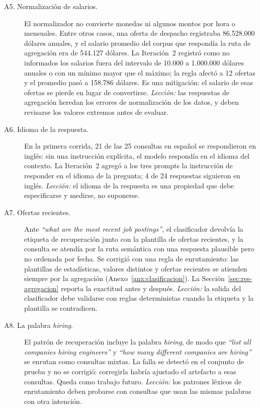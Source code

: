 \begin{description}
    \item[A5. Normalización de salarios.] El normalizador no convierte monedas ni algunos montos por hora o mensuales. Entre otros casos, una oferta de despacho registraba 86.528.000 dólares anuales, y el salario promedio del corpus que respondía la ruta de agregación era de 544.127 dólares. La Iteración~2 registró como no informados los salarios fuera del intervalo de 10.000 a 1.000.000 dólares anuales o con un mínimo mayor que el máximo; la regla afectó a 12 ofertas y el promedio pasó a 158.786 dólares. Es una mitigación: el salario de esas ofertas se pierde en lugar de convertirse. \emph{Lección:} las respuestas de agregación heredan los errores de normalización de los datos, y deben revisarse los valores extremos antes de evaluar.
    \item[A6. Idioma de la respuesta.] En la primera corrida, 21 de las 25 consultas en español se respondieron en inglés: sin una instrucción explícita, el modelo respondía en el idioma del contexto. La Iteración~2 agregó a los tres prompts la instrucción de responder en el idioma de la pregunta; 4 de 24 respuestas siguieron en inglés. \emph{Lección:} el idioma de la respuesta es una propiedad que debe especificarse y medirse, no suponerse.
    \item[A7. Ofertas recientes.] Ante \textit{\enquote{what are the most recent job postings}}, el clasificador devolvía la etiqueta de recuperación junto con la plantilla de ofertas recientes, y la consulta se atendía por la ruta semántica con una respuesta plausible pero no ordenada por fecha. Se corrigió con una regla de enrutamiento: las plantillas de estadísticas, valores distintos y ofertas recientes se atienden siempre por la agregación (Anexo~\ref{anx:clasificacion}). La Sección~\ref{sec:res-agregacion} reporta la exactitud antes y después. \emph{Lección:} la salida del clasificador debe validarse con reglas deterministas cuando la etiqueta y la plantilla se contradicen.
    \item[A8. La palabra \textit{hiring}.] El patrón de recuperación incluye la palabra \textit{hiring}, de modo que \textit{\enquote{list all companies hiring engineers}} y \textit{\enquote{how many different companies are hiring}} se enrutan como consultas mixtas. La falla se detectó en el conjunto de prueba y no se corrigió: corregirla habría ajustado el artefacto a esas consultas. Queda como trabajo futuro. \emph{Lección:} los patrones léxicos de enrutamiento deben probarse con consultas que usan las mismas palabras con otra intención.
\end{description}


